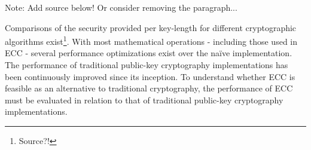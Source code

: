 Note: Add source below! Or consider removing the paragraph...

Comparisons of the security provided per key-length for different cryptographic algorithms exist\footnote{Source?!}. With
most mathematical operations - including those used in ECC - several performance optimizations exist over the naïve
implementation. The performance of traditional public-key cryptography implementations has been continuously improved
since its inception. To understand whether ECC is feasible as an alternative to traditional cryptography, the performance
of ECC must be evaluated in relation to that of traditional public-key cryptography implementations.